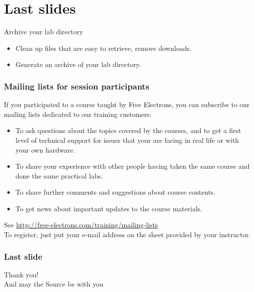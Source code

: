 \section{Last slides}

\setuplabframe
{Archive your lab directory}
{
  \begin{itemize}
  \item Clean up files that are easy to retrieve, remove downloads.
  \item Generate an archive of your lab directory.
  \end{itemize}
}


\begin{frame}
  \frametitle{Mailing lists for session participants}
  If you participated to a course taught by Free Electrons,
  you can subscribe to our mailing lists dedicated
  to our training customers:
  \begin{itemize}
  \item To ask questions about the topics covered by the courses,
        and to get a first level of technical support for issues
        that your are facing in real life or with your own hardware.
  \item To share your experience with other people having taken the same
        course and done the same practical labs.
  \item To share further comments and suggestions about course contents.
  \item To get news about important updates to the course materials. 
  \end{itemize}
  See \url{http://free-electrons.com/training/mailing-lists}
  \\
  To register, just put your e-mail address on the sheet provided
  by your instructor.
\end{frame}

\begin{frame}
  \frametitle{Last slide}
  \begin{center}
    \Huge
    Thank you!\\
    \huge
    And may the Source be with you\\
  \end{center}
\end{frame}
